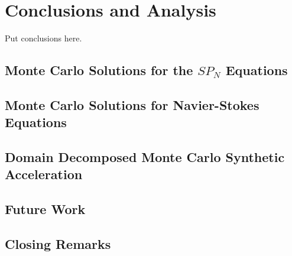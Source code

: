 \chapter{Conclusions and Analysis}
\label{ch:conclusion}
Put conclusions here.

\section{Monte Carlo Solutions for the $SP_N$ Equations}
\label{sec:spn_conclusion}

\section{Monte Carlo Solutions for Navier-Stokes Equations}
\label{sec:nonlinear_conclusions}

\section{Domain Decomposed Monte Carlo Synthetic Acceleration}
\label{sec:parallel_mc_conclusions}

\section{Future Work}
\label{sec:future_work}

\section{Closing Remarks}
\label{sec:closing}
